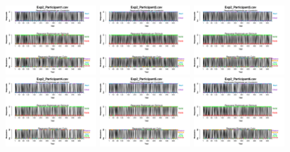 \begin{figure}[th]
\centering
\includegraphics[width=0.30\textwidth]{Figures/BiasResp_Exp2_P1} \includegraphics[width=0.30\textwidth]{Figures/BiasResp_Exp2_P2} \includegraphics[width=0.30\textwidth]{Figures/BiasResp_Exp2_P3}
\includegraphics[width=0.30\textwidth]{Figures/BiasResp_Exp2_P4} \includegraphics[width=0.30\textwidth]{Figures/BiasResp_Exp2_P5} \includegraphics[width=0.30\textwidth]{Figures/BiasResp_Exp2_P6}

\end{figure}
